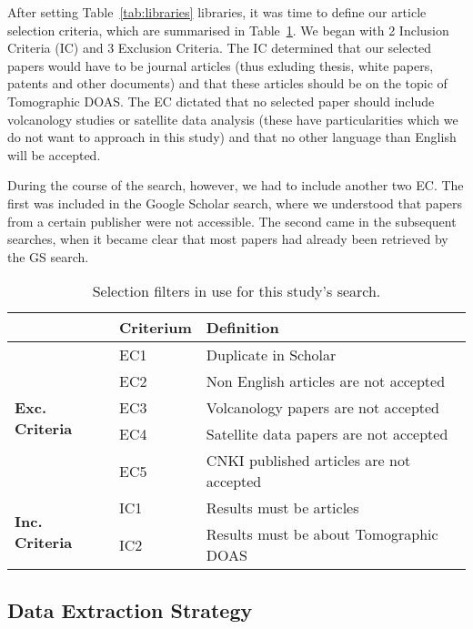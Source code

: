 After setting Table~\ref{tab:libraries} libraries, it was time to define
our article selection criteria, which are summarised in
Table~\ref{tab:select_filters}. We began with 2 Inclusion Criteria (IC)
and 3 Exclusion Criteria. The IC determined that our selected papers
would have to be journal articles (thus exluding thesis, white papers,
patents and other documents) and that these articles should be on the
topic of Tomographic DOAS. The EC dictated that no selected paper should
include volcanology studies or satellite data analysis (these have
particularities which we do not want to approach in this study) and that
no other language than English will be accepted.

During the course of the search, however, we had to include another two
EC. The first was included in the Google Scholar search, where we
understood that papers from a certain publisher were not accessible. The
second came in the subsequent searches, when it became clear that most
papers had already been retrieved by the GS search. 

\begin{table}[htb]
\centering
\caption{Selection filters in use for this study's search.}
\label{tab:select_filters}
\begin{tabularx}{\textwidth}{lXl}%
\toprule
\multicolumn{1}{l}{} & \textbf{Criterium} & \textbf{Definition} \\ \midrule
\multirow{5}{*}{\textbf{Exc. Criteria}} & EC1 & Duplicate in Scholar \\
 & EC2 & Non English articles are not accepted \\
 & EC3 & Volcanology papers are not accepted \\
 & EC4 & Satellite data papers are not accepted \\
 & EC5 & CNKI published articles are not accepted \\ \midrule
\multicolumn{1}{l}{\multirow{2}{*}{\textbf{Inc. Criteria}}} & IC1 & Results must be articles \\
\multicolumn{1}{l}{} & IC2 & Results must be about Tomographic DOAS \\ \bottomrule
\end{tabularx}
\end{table}

\subsection{Data Extraction Strategy}
\label{sub:data_extraction_strategy}

